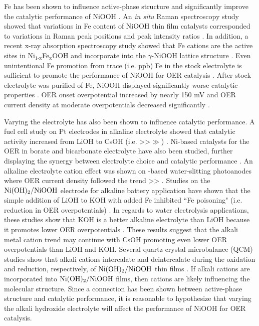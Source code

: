 \documentclass[journal=jpccck,manuscript=article,email=true]{achemso}
\begin{document}
Fe has been shown to influence active-phase structure and significantly improve the catalytic performance of NiOOH \cite{corrigan-1987-catal-oxygen,landon-2012-spect-charac,louie-2013-inves-thin,smith-2013-water-oxidat-catal,mccrory-2013-bench-heter,trotochaud-2014-nickel-iron}. An \emph{in situ} Raman spectroscopy study showed that variations in Fe content of NiOOH thin film catalysts corresponded to variations in Raman peak positions and peak intensity ratios \cite{louie-2013-inves-thin}. In addition, a recent x-ray absorption spectroscopy study showed that Fe cations are the active sites in Ni$_{\text{1-x}}$Fe$_{\text{x}}$OOH and incorporate into the $\gamma$-NiOOH lattice structure \cite{friebel-2015-ident-highl}. Even unintentional Fe promotion from trace (i.e. ppb) Fe in the stock electrolyte is sufficient to promote the performance of NiOOH for OER catalysis \cite{trotochaud-2014-nickel-iron}. After stock electrolyte was purified of Fe, NiOOH displayed significantly worse catalytic properties \cite{trotochaud-2014-nickel-iron}. OER onset overpotential increased by nearly 150 mV and OER current density at moderate overpotentials decreased significantly \cite{trotochaud-2014-nickel-iron}.

Varying the electrolyte has also been shown to influence catalytic performance. A fuel cell study on Pt electrodes in alkaline electrolyte showed that catalytic activity increased from LiOH to CsOH (i.e. \textgreater{}\textgreater{}$\gg$) \cite{strmcnik-2009}. Ni-based catalysts for the OER in borate and bicarbonate electrolyte have also been studied, further displaying the synergy between electrolyte choice and catalytic performance \cite{dinca-2010-nickel,bediako-2012-struc-activ,bediako-2013-mechan-studies,joya-2014-ni-based}. An alkaline electrolyte cation effect was shown on -based water-slitting photoanodes where OER current density followed the trend \textgreater{}\textgreater{} \cite{ding-2015-abnor-effec}. Studies on the \(\ce{Ni(OH)2}/\ce{NiOOH}\) electrode for alkaline battery application have shown that the simple addition of LiOH to KOH with added Fe inhibited ``Fe poisoning" (i.e. reduction in OER overpotentials) \cite{armstrong-1986,kamnev-1996}. In regards to water electrolysis applications, these studies show that KOH is a better alkaline electrolyte than LiOH because it promotes lower OER overpotentials \cite{armstrong-1986,kamnev-1996}. These results suggest that the alkali metal cation trend may continue with CsOH promoting even lower OER overpotentials than LiOH and KOH. Several quartz crystal microbalance (QCM) studies show that alkali cations intercalate and deintercalate during the oxidation and reduction, respectively, of \(\ce{Ni(OH)2}/\ce{NiOOH}\) thin films \cite{barnard-1981-studies-iv,bernard-1991-ac,wehrens-dijksma-2006-elect-quart}. If alkali cations are incorporated into \(\ce{Ni(OH)2}/\ce{NiOOH}\) films, then cations are likely influencing the molecular structure. Since a connection has been shown between active-phase structure and catalytic performance, it is reasonable to hypothesize that varying the alkali hydroxide electrolyte will affect the performance of NiOOH for OER catalysis.
\end{document}
